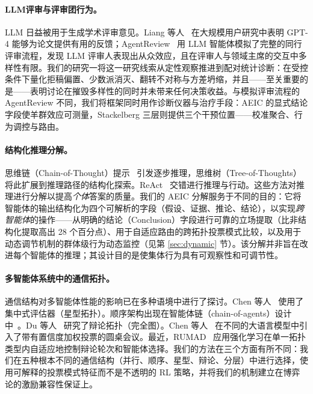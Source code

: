 \paragraph{LLM评审与评审团行为。}
LLM 日益被用于生成学术评审意见。Liang 等人~\cite{liang2024llmreview} 在大规模用户研究中表明 GPT-4 能够为论文提供有用的反馈；AgentReview~\cite{jin2024agentreview} 用 LLM 智能体模拟了完整的同行评审流程，发现 LLM 评审人表现出从众效应，且在评审人与领域主席的交互中多样性有限。我们的研究一将这一研究线索从定性观察推进到配对统计诊断：在受控条件下量化拒稿偏置、少数派消灭、翻转不对称与方差坍缩，并且——至关重要的是——表明讨论在摧毁多样性的同时并未带来任何决策收益。与模拟评审流程的 AgentReview 不同，我们将框架同时用作诊断仪器与治疗手段：AEIC 的显式结论字段使羊群效应可测量，Stackelberg 三层则提供三个干预位置——校准聚合、行为调控与路由。

\paragraph{结构化推理分解。}
思维链（Chain-of-Thought）提示~\cite{wei2022chain} 引发逐步推理，思维树（Tree-of-Thoughts）~\cite{yao2024tree} 将此扩展到推理路径的结构化探索。ReAct~\cite{yao2023react} 交错进行推理与行动。这些方法对推理进行分解以提高\emph{个体}答案的质量。我们的 AEIC 分解服务于不同的目的：它将智能体的输出结构化为四个可解析的字段（假设、证据、推论、结论），以实现\emph{跨智能体}的操作——从明确的结论（Conclusion）字段进行可靠的立场提取（比非结构化提取高出 28 个百分点）、用于自适应路由的跨拓扑投票模式比较，以及用于动态调节机制的群体级行为动态监控（见第 \ref{sec:dynamic} 节）。该分解并非旨在改进每个智能体的推理；其设计目的是使集体行为具有可观察性和可调节性。

\paragraph{多智能体系统中的通信拓扑。}
通信结构对多智能体性能的影响已在多种语境中进行了探讨。Chen 等人~\cite{chen2023agentverse} 使用了集中式评估器（星型拓扑）。顺序架构出现在智能体链（chain-of-agents）设计中~\cite{hong2023metagpt}。Du 等人~\cite{du2024improving} 研究了辩论拓扑（完全图）。Chen 等人~\cite{chen2024reconcile} 在不同的大语言模型中引入了带有置信度加权投票的圆桌会议。最近，RUMAD~\cite{wang2026rumad} 应用强化学习在单一拓扑类型内自适应地控制辩论轮次和智能体选择。我们的方法在三个方面有所不同：我们在五种根本不同的通信结构（并行、顺序、星型、辩论、分层）中进行选择，使用可解释的投票模式特征而不是不透明的 RL 策略，并将我们的机制建立在博弈论的激励兼容性保证上。

